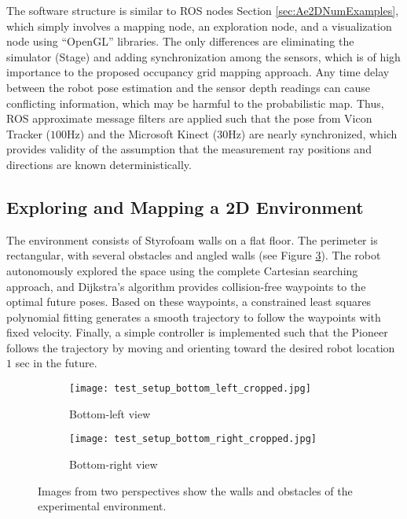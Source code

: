 The software structure is similar to ROS nodes Section \ref{sec:Ae2DNumExamples}, which simply involves a mapping node, an exploration node, and a visualization node using ``OpenGL'' libraries. The only differences are eliminating the simulator (Stage) and adding synchronization among the sensors, which is of high importance to the proposed occupancy grid mapping approach. Any time delay between the robot pose estimation and the sensor depth readings can cause conflicting information, which may be harmful to the probabilistic map. Thus, ROS approximate message filters are applied such that the pose from Vicon Tracker ($100$Hz) and the Microsoft Kinect ($30$Hz) are nearly synchronized, which provides validity of the assumption that the measurement ray positions and directions are known deterministically.

\subsection{Exploring and Mapping a 2D Environment}
The environment consists of Styrofoam walls on a flat floor. The perimeter is rectangular, with several obstacles and angled walls (see Figure \ref{fig:ExpSetupPhoto}). The robot autonomously explored the space using the complete Cartesian searching approach, and Dijkstra's algorithm provides collision-free waypoints to the optimal future poses. Based on these waypoints, a constrained least squares polynomial fitting generates a smooth trajectory to follow the waypoints with fixed velocity. Finally, a simple controller is implemented such that the Pioneer follows the trajectory by moving and orienting toward the desired robot location $1$ sec in the future.

\begin{figure}
	\centering
    	\begin{subfigure}[b]{0.45\textwidth}
        		\texttt{[image: test\_setup\_bottom\_left\_cropped.jpg]}
        		\caption{Bottom-left view}
        		\label{fig:Experiment_blv}
    	\end{subfigure}
	\hspace*{0.05\columnwidth}
	\begin{subfigure}[b]{0.45\textwidth}
        		\texttt{[image: test\_setup\_bottom\_right\_cropped.jpg]}
        		\caption{Bottom-right view}
        		\label{fig:Experiment_brv}
    	\end{subfigure}
\caption{Images from two perspectives show the walls and obstacles of the experimental environment.}
\label{fig:ExpSetupPhoto}
\end{figure}


